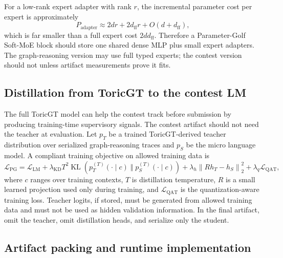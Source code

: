 \documentclass[11pt]{article}
\theoremstyle{definition}
\theoremstyle{plain}
\theoremstyle{remark}
\numberwithin{equation}{section}
\newcommand{\norm}[1]{\left\lVert #1\right\rVert}
\begin{document}
For a low-rank expert adapter with rank $r$, the incremental parameter cost per expert is approximately
\begin{equation}
  P_{\mathrm{adapter}}\approx 2dr+2d_{\mathrm{ff}}r+O(d+d_{\mathrm{ff}}),
\end{equation}
which is far smaller than a full expert cost $2dd_{\mathrm{ff}}$.  Therefore a Parameter-Golf Soft-MoE block should store one shared dense MLP plus small expert adapters.  The graph-reasoning version may use full typed experts; the contest version should not unless artifact measurements prove it fits.

\subsection{Distillation from ToricGT to the contest LM}

The full ToricGT model can help the contest track before submission by producing training-time supervisory signals.  The contest artifact should not need the teacher at evaluation.  Let $p_T$ be a trained ToricGT-derived teacher distribution over serialized graph-reasoning traces and $p_S$ be the micro language model.  A compliant training objective on allowed training data is
\begin{equation}
  \mathcal L_{\mathrm{PG}}=\mathcal L_{\mathrm{LM}}
  +\lambda_{\mathrm{KD}}T^2\operatorname{KL}\left(p_T^{(T)}(\cdot\mid c)\;\Vert\;p_S^{(T)}(\cdot\mid c)\right)
  +\lambda_h\norm{R h_T-h_S}_2^2
  +\lambda_q\mathcal L_{\mathrm{QAT}},
\end{equation}
where $c$ ranges over training contexts, $T$ is distillation temperature, $R$ is a small learned projection used only during training, and $\mathcal L_{\mathrm{QAT}}$ is the quantization-aware training loss.  Teacher logits, if stored, must be generated from allowed training data and must not be used as hidden validation information.  In the final artifact, omit the teacher, omit distillation heads, and serialize only the student.


\subsection{Artifact packing and runtime implementation}
\end{document}

